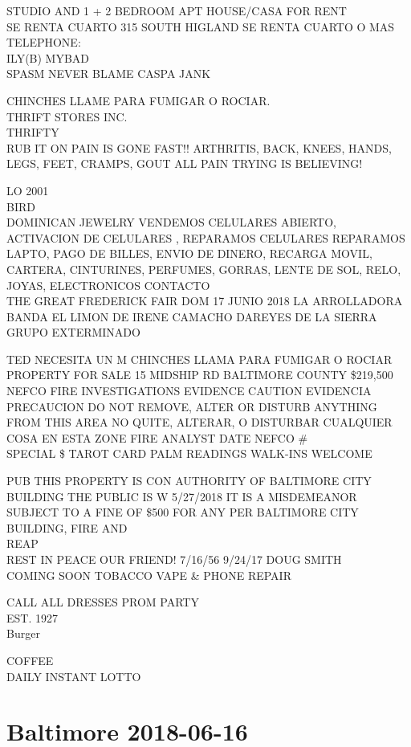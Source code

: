 \documentclass[10pt,letterpaper]{article}
\begin{document}
STUDIO AND 1 + 2 BEDROOM APT HOUSE/CASA FOR RENT\\
SE RENTA CUARTO 315 SOUTH HIGLAND SE RENTA CUARTO O MAS TELEPHONE:\\
ILY(B) MYBAD\\
SPASM NEVER BLAME CASPA JANK

CHINCHES LLAME PARA FUMIGAR O ROCIAR.\\
THRIFT STORES INC.\\
THRIFTY\\
RUB IT ON PAIN IS GONE FAST!! ARTHRITIS, BACK, KNEES, HANDS, LEGS, FEET, CRAMPS, GOUT ALL PAIN TRYING IS BELIEVING!

LO 2001\\
BIRD\\
DOMINICAN JEWELRY VENDEMOS CELULARES ABIERTO, ACTIVACION DE CELULARES , REPARAMOS CELULARES REPARAMOS LAPTO, PAGO DE BILLES, ENVIO DE DINERO, RECARGA MOVIL, CARTERA, CINTURINES, PERFUMES, GORRAS, LENTE DE SOL, RELO, JOYAS, ELECTRONICOS CONTACTO\\
THE GREAT FREDERICK FAIR DOM 17 JUNIO 2018 LA ARROLLADORA BANDA EL LIMON DE IRENE CAMACHO DAREYES DE LA SIERRA GRUPO EXTERMINADO

TED NECESITA UN M CHINCHES LLAMA PARA FUMIGAR O ROCIAR\\
PROPERTY FOR SALE 15 MIDSHIP RD BALTIMORE COUNTY \$219,500\\
NEFCO FIRE INVESTIGATIONS EVIDENCE CAUTION EVIDENCIA PRECAUCION DO NOT REMOVE, ALTER OR DISTURB ANYTHING FROM THIS AREA NO QUITE, ALTERAR, O DISTURBAR CUALQUIER COSA EN ESTA ZONE FIRE ANALYST DATE NEFCO \#\\
SPECIAL \$ TAROT CARD PALM READINGS WALK{-}INS WELCOME

PUB THIS PROPERTY IS CON AUTHORITY OF BALTIMORE CITY BUILDING THE PUBLIC IS W 5/27/2018 IT IS A MISDEMEANOR SUBJECT TO A FINE OF \$500 FOR ANY PER BALTIMORE CITY BUILDING, FIRE AND\\
REAP\\
REST IN PEACE OUR FRIEND!  7/16/56 9/24/17 DOUG SMITH\\
COMING SOON TOBACCO VAPE \& PHONE REPAIR

CALL ALL DRESSES PROM PARTY\\
EST. 1927\\
Burger

COFFEE\\
DAILY INSTANT LOTTO
\

\section*{Baltimore 2018-06-16}
\end{document}

